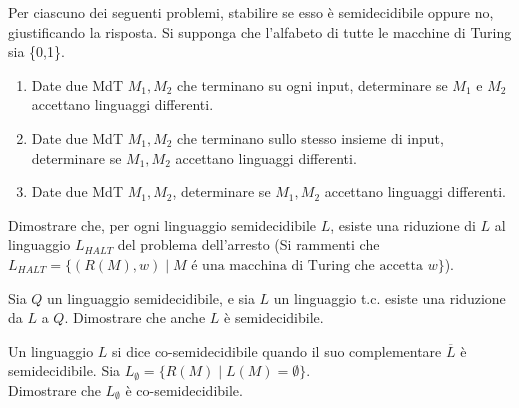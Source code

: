 \documentclass{article}  %
\begin{document}
\begin{esercizio}[Esercizio 6]
Per ciascuno dei seguenti problemi, stabilire se esso è semidecidibile oppure no, giustificando la risposta.
Si supponga che l'alfabeto di tutte le macchine di Turing sia \{0,1\}. 
\begin{enumerate}
    \item Date due MdT $M_1, M_2$ che terminano su ogni input, determinare se $M_1$ e $M_2$ 
    accettano linguaggi differenti.
    \item Date due MdT $M_1, M_2$ che terminano sullo stesso insieme di input, determinare
    se $M_1, M_2$ accettano linguaggi differenti.
    \item Date due MdT $M_1, M_2$, determinare se $M_1, M_2$ accettano linguaggi differenti.
\end{enumerate}
\end{esercizio}

\begin{esercizio}[Esercizio 7]
Dimostrare che, per ogni linguaggio semidecidibile $L$, esiste una riduzione
 di $L$ al linguaggio $L_{HALT}$ del problema dell'arresto (Si rammenti che
 $L_{HALT} = \{(R(M),w) \mid M \text{ é una macchina di Turing che accetta } w\}$).
\end{esercizio}

\begin{esercizio}[Esercizio 8]
Sia $Q$ un linguaggio semidecidibile, e sia $L$ un linguaggio t.c. esiste una riduzione 
da $L$ a $Q$. Dimostrare che anche $L$ è semidecidibile.
\end{esercizio}

\begin{esercizio}[Esercizio 9]
Un linguaggio $L$ si dice co-semidecidibile quando il suo complementare $\overline{L}$
è semidecidibile. Sia $L_{\emptyset}=\{R(M) \mid L(M)=\emptyset\}$. \\
Dimostrare che $L_{\emptyset}$ è co-semidecidibile.
\end{esercizio}
\end{document}
